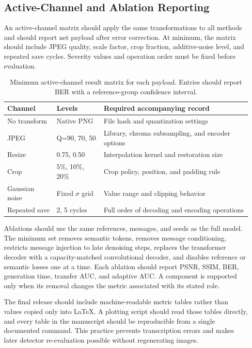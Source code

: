 \documentclass[pdflatex,sn-mathphys-num]{sn-jnl}
\begin{document}
\begin{appendices}
\section{Active-Channel and Ablation Reporting}
\label{app:reporting}
\setcounter{table}{0}

An active-channel matrix should apply the same transformations to all methods and should report net payload after error correction. At minimum, the matrix should include JPEG quality, scale factor, crop fraction, additive-noise level, and repeated save cycles. Severity values and operation order must be fixed before evaluation.

\begin{table}[!h]
\centering
\caption{Minimum active-channel result matrix for each payload. Entries should report BER with a reference-group confidence interval.}
\label{tab:channelmatrix}
\footnotesize
\begin{tabularx}{\columnwidth}{p{2.3cm}p{2.2cm}X}
\toprule
\textbf{Channel} & \textbf{Levels} & \textbf{Required accompanying record} \\
\midrule
No transform & Native PNG & File hash and quantization settings \\
JPEG & Q=90, 70, 50 & Library, chroma subsampling, and encoder options \\
Resize & 0.75, 0.50 & Interpolation kernel and restoration size \\
Crop & 5\%, 10\%, 20\% & Crop policy, position, and padding rule \\
Gaussian noise & Fixed $\sigma$ grid & Value range and clipping behavior \\
Repeated save & 2, 5 cycles & Full order of decoding and encoding operations \\
\bottomrule
\end{tabularx}
\end{table}

Ablations should use the same references, messages, and seeds as the full model. The minimum set removes semantic tokens, removes message conditioning, restricts message injection to late denoising steps, replaces the transformer decoder with a capacity-matched convolutional decoder, and disables reference or semantic losses one at a time. Each ablation should report PSNR, SSIM, BER, generation time, transfer AUC, and adaptive AUC. A component is supported only when its removal changes the metric associated with its stated role.

The final release should include machine-readable metric tables rather than values copied only into LaTeX. A plotting script should read those tables directly, and every table in the manuscript should be reproducible from a single documented command. This practice prevents transcription errors and makes later detector re-evaluation possible without regenerating images.

\end{appendices}
\end{document}
